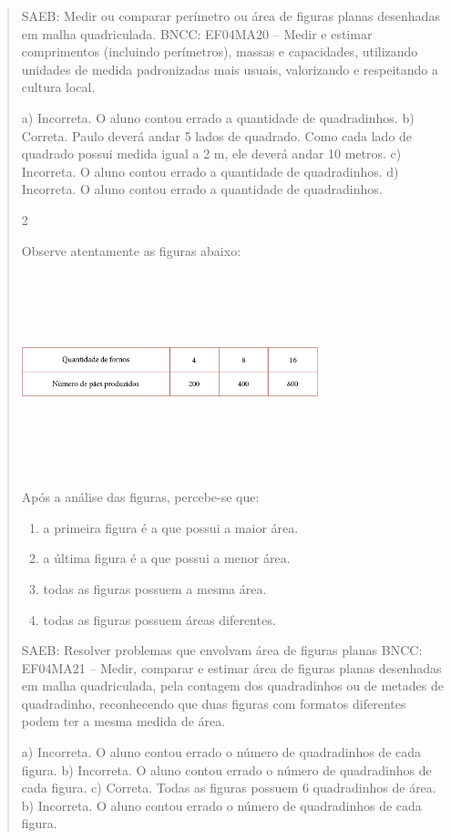 \begin{mdframed}[linewidth=2pt,linecolor=salmao,roundcorner=2pt]
\begin{itemize}
{\begin{itemize}
\begin{escolha}
{\begin{quote}
SAEB: Medir ou comparar perímetro ou área de figuras planas desenhadas em malha quadriculada.
BNCC: EF04MA20 -- Medir e estimar comprimentos (incluindo perímetros), massas e capacidades, utilizando
unidades de medida padronizadas mais usuais, valorizando e respeitando a cultura local.

a) Incorreta. O aluno contou errado a quantidade de quadradinhos.
b) Correta. Paulo deverá andar 5 lados de quadrado. Como cada lado de quadrado possui medida igual a 2 m, ele deverá andar 10 metros.
c) Incorreta. O aluno contou errado a quantidade de quadradinhos.
d) Incorreta. O aluno contou errado a quantidade de quadradinhos.


\num{2}

Observe atentamente as figuras abaixo:

\includegraphics[width=3.39196in,height=2.27520in]{media/image71.png}

Após a análise das figuras, percebe-se que:

\begin{enumerate}
\item
  a primeira figura é a que possui a maior área.
\item
  a última figura é a que possui a menor área.
\item
  todas as figuras possuem a mesma área.
\item
  todas as figuras possuem áreas diferentes.
\end{enumerate}

SAEB: Resolver problemas que envolvam área de figuras planas
BNCC: EF04MA21 -- Medir, comparar e estimar área de figuras planas desenhadas em malha quadriculada,
pela contagem dos quadradinhos ou de metades de quadradinho, reconhecendo que duas figuras
com formatos diferentes podem ter a mesma medida de área.

a) Incorreta. O aluno contou errado o número de quadradinhos de cada figura.
b) Incorreta. O aluno contou errado o número de quadradinhos de cada figura.
c) Correta. Todas as figuras possuem 6 quadradinhos de área.
b) Incorreta. O aluno contou errado o número de quadradinhos de cada figura.


\end{quote}}
\end{escolha}
\end{itemize}}
\end{itemize}
\end{mdframed}
